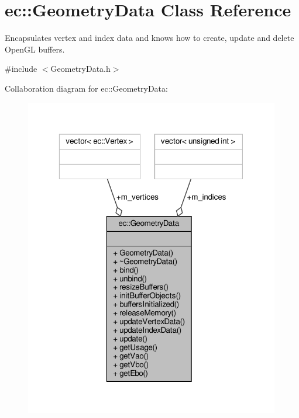 \hypertarget{classec_1_1_geometry_data}{}\section{ec\+:\+:Geometry\+Data Class Reference}
\label{classec_1_1_geometry_data}


Encapsulates vertex and index data and knows how to create, update and delete Open\+GL buffers.  




{\ttfamily \#include $<$Geometry\+Data.\+h$>$}



Collaboration diagram for ec\+:\+:Geometry\+Data\+:\nopagebreak
\begin{figure}[H]
\begin{center}
\leavevmode
\includegraphics[width=316pt]{classec_1_1_geometry_data__coll__graph}
\end{center}
\end{figure}
